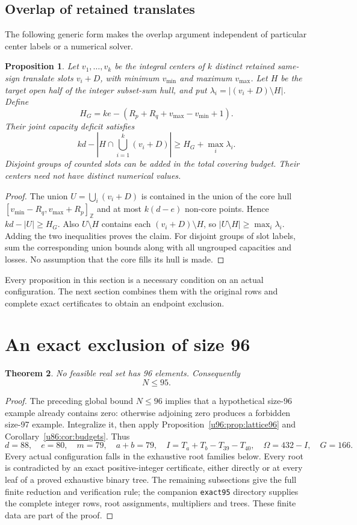 \documentclass[11pt,a4paper]{article}
\newtheorem{theorem}{Theorem}[section]
\newtheorem{proposition}[theorem]{Proposition}
\theoremstyle{remark}
\newcommand{\Z}{\mathbb Z}
\begin{document}
\subsection{Overlap of retained translates}
The following generic form makes the overlap argument independent of
particular center labels or a numerical solver.

\begin{proposition}\label{u86:prop:overlap}
Let $v_1,\ldots,v_k$ be the integral centers of $k$ distinct retained
same-sign translate slots $v_i+D$, with minimum $v_{\min}$ and maximum
$v_{\max}$. Let $H$ be the target open half of the integer subset-sum
hull, and put $\lambda_i=|(v_i+D)\setminus H|$. Define
\[
 H_G=ke-(R_p+R_q+v_{\max}-v_{\min}+1).
\]
Their joint capacity deficit satisfies
\[
 kd-\left|H\cap\bigcup_{i=1}^k(v_i+D)\right|
 \ge H_G+\max_i\lambda_i.
\]
Disjoint groups of counted slots can be added in the total covering
budget. Their centers need not have distinct numerical values.
\end{proposition}
\begin{proof}
The union $U=\bigcup_i(v_i+D)$ is contained in the union of the core
hull $[v_{\min}-R_q,v_{\max}+R_p]_{\Z}$ and at most $k(d-e)$ non-core
points. Hence $kd-|U|\ge H_G$. Also $U\setminus H$ contains each
$(v_i+D)\setminus H$, so $|U\setminus H|\ge\max_i\lambda_i$.
Adding the two inequalities proves the claim. For disjoint groups of
slot labels, sum the corresponding union bounds along with all
ungrouped capacities and losses. No assumption that the core fills
its hull is made.
\end{proof}

Every proposition in this section is a necessary condition on an actual
configuration. The next section combines them with the original
rows and complete exact certificates to obtain an endpoint exclusion.

\section{An exact exclusion of size 96}\label{u86:sec:upper95}
\begin{theorem}\label{u86:thm:upper95}
No feasible real set has 96 elements. Consequently
\[
 \boxed{N\le95.}
\]
\end{theorem}
\begin{proof}
The preceding global bound $N\le96$ implies that a hypothetical size-96
example already contains zero: otherwise adjoining zero produces a
forbidden size-97 example. Integralize it, then apply Proposition~\ref{u96:prop:lattice96} and Corollary~\ref{u86:cor:budgets}. Thus
\[
 d=88,\quad e=80,\quad m=79,\quad a+b=79,\quad
 I=T_a+T_b-T_{39}-T_{40},\quad\Omega=432-I,\quad G=166.
\]
Every actual configuration falls in the exhaustive root families below.
Every root is contradicted by an exact positive-integer certificate,
either directly or at every leaf of a proved exhaustive binary tree.
The remaining subsections give the full finite reduction and verification
rule; the companion \texttt{exact95} directory supplies the complete
integer rows, root assignments, multipliers and trees. These finite data
are part of the proof.
\end{proof}
\end{document}
